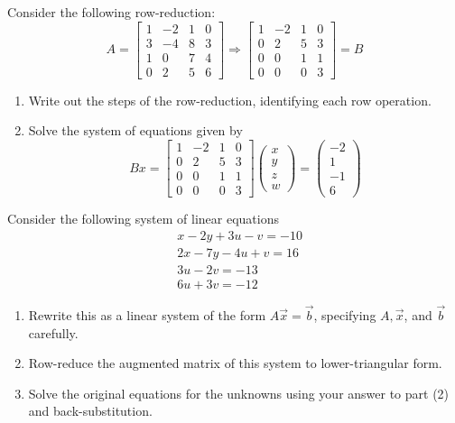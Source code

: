 \documentclass[12pt]{amsart}
\begin{document}
\begin{problem}
Consider the following row-reduction:
$$
A=\left[\begin{array}{cccc}
1 & -2 & 1 & 0 \\
3 & -4 & 8 & 3 \\
1 & 0 & 7 & 4 \\
0 & 2 & 5 & 6
\end{array}\right] \Rightarrow\left[\begin{array}{cccc}
1 & -2 & 1 & 0 \\
0 & 2 & 5 & 3 \\
0 & 0 & 1 & 1 \\
0 & 0 & 0 & 3
\end{array}\right]=B
$$

\begin{enumerate}
    \item  Write out the steps of the row-reduction, identifying each row operation.

    \item  Solve the system of equations given by
$$
B x=\left[\begin{array}{cccc}
1 & -2 & 1 & 0 \\
0 & 2 & 5 & 3 \\
0 & 0 & 1 & 1 \\
0 & 0 & 0 & 3
\end{array}\right]\left(\begin{array}{c}
x \\
y \\
z \\
w
\end{array}\right)=\left(\begin{array}{c}
-2 \\
1 \\
-1 \\
6
\end{array}\right)
$$
\end{enumerate}
\end{problem}


\begin{problem}
Consider the following system of linear equations
$$
\begin{aligned}
& x-2 y+3 u-v=-10 \\
& 2 x-7 y-4 u+v=16 \\
& 3 u-2 v=-13 \\
& 6 u+3 v=-12
\end{aligned}
$$
\begin{enumerate}
    \item  Rewrite this as a linear system of the form $A \vec{x}=\vec{b}$, specifying $A, \vec{x}$, and $\vec{b}$ carefully.
    \item  Row-reduce the augmented matrix of this system to lower-triangular form.
    \item  Solve the original equations for the unknowns using your answer to part (2) and back-substitution.
\end{enumerate}
\end{problem}
\end{document}
